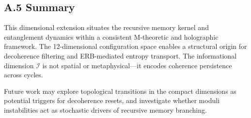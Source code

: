 \subsection*{A.5 Summary}

This dimensional extension situates the recursive memory kernel and entanglement dynamics within a consistent M-theoretic and holographic framework. The 12-dimensional configuration space enables a structural origin for decoherence filtering and ERB-mediated entropy transport. The informational dimension \( \mathcal{I} \) is not spatial or metaphysical—it encodes coherence persistence across cycles.

Future work may explore topological transitions in the compact dimensions as potential triggers for decoherence resets, and investigate whether moduli instabilities act as stochastic drivers of recursive memory branching.

